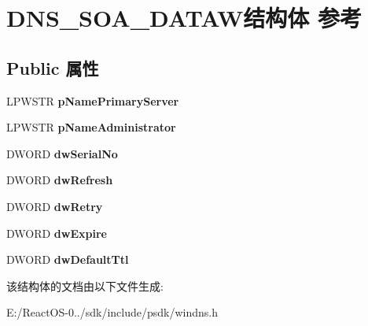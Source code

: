 \hypertarget{struct_d_n_s___s_o_a___d_a_t_a_w}{}\section{D\+N\+S\+\_\+\+S\+O\+A\+\_\+\+D\+A\+T\+A\+W结构体 参考}
\label{struct_d_n_s___s_o_a___d_a_t_a_w}
\subsection*{Public 属性}
\begin{DoxyCompactItemize}
\item 
\mbox{\label{struct_d_n_s___s_o_a___d_a_t_a_w_a0f6824ead6ebc58bf4122c4f19477b16}} 
L\+P\+W\+S\+TR {\bfseries p\+Name\+Primary\+Server}
\item 
\mbox{\label{struct_d_n_s___s_o_a___d_a_t_a_w_a04bb2ee207b198175341830c3d57ce6f}} 
L\+P\+W\+S\+TR {\bfseries p\+Name\+Administrator}
\item 
\mbox{\label{struct_d_n_s___s_o_a___d_a_t_a_w_afd86b54af92f3f8110d5bbf9a94ffcbe}} 
D\+W\+O\+RD {\bfseries dw\+Serial\+No}
\item 
\mbox{\label{struct_d_n_s___s_o_a___d_a_t_a_w_a655fd9d64e4ee1bc7aa56fe664ae6fd3}} 
D\+W\+O\+RD {\bfseries dw\+Refresh}
\item 
\mbox{\label{struct_d_n_s___s_o_a___d_a_t_a_w_a187373e566be2c4f9eac1b8dc53a53af}} 
D\+W\+O\+RD {\bfseries dw\+Retry}
\item 
\mbox{\label{struct_d_n_s___s_o_a___d_a_t_a_w_a38e413dd931b9e68b0efef3c57b3f900}} 
D\+W\+O\+RD {\bfseries dw\+Expire}
\item 
\mbox{\label{struct_d_n_s___s_o_a___d_a_t_a_w_a88d14ed966a2e505be25f56388d039d5}} 
D\+W\+O\+RD {\bfseries dw\+Default\+Ttl}
\end{DoxyCompactItemize}


该结构体的文档由以下文件生成\+:\begin{DoxyCompactItemize}
\item 
E\+:/\+React\+O\+S-\/0../sdk/include/psdk/windns.\+h\end{DoxyCompactItemize}
